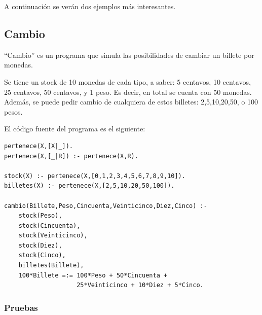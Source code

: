 \documentclass[12pt,titlepage]{article}
\begin{document}
A continuación se verán dos ejemplos más interesantes.

\subsection{Cambio}

``Cambio'' es un programa que simula las posibilidades de cambiar un billete por monedas.

Se tiene un stock de 10 monedas de cada tipo, a saber: 5 centavos, 10 centavos, 25 centavos, 50 centavos, y 1 peso. Es decir, en total se cuenta con 50 monedas. Además, se puede pedir cambio de cualquiera de estos billetes: 2,5,10,20,50, o 100 pesos.

El código fuente del programa es el siguiente:
\begin{lstlisting}
pertenece(X,[X|_]).
pertenece(X,[_|R]) :- pertenece(X,R).

stock(X) :- pertenece(X,[0,1,2,3,4,5,6,7,8,9,10]).
billetes(X) :- pertenece(X,[2,5,10,20,50,100]).

cambio(Billete,Peso,Cincuenta,Veinticinco,Diez,Cinco) :-
	stock(Peso),
	stock(Cincuenta),
	stock(Veinticinco),
	stock(Diez),
	stock(Cinco),
	billetes(Billete),
	100*Billete =:= 100*Peso + 50*Cincuenta + 
	                25*Veinticinco + 10*Diez + 5*Cinco.
\end{lstlisting}

\subsubsection{Pruebas}
\end{document}
